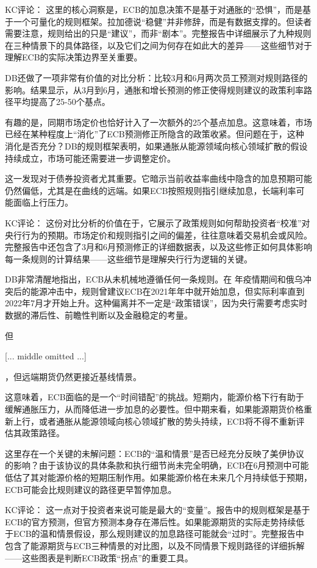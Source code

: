 \documentclass[11pt]{ctexart}
\begin{document}
KC评论： 这里的核心洞察是，ECB的加息决策不是基于对通胀的“恐惧”，而是基于一个可量化的规则框架。拉加德说“稳健”并非修辞，而是有数据支撑的。但读者需要注意，规则给出的只是“建议”，而非“剧本”。完整报告中详细展示了九种规则在三种情景下的具体路径，以及它们之间为何存在如此大的差异——这些细节对于理解ECB的实际决策边界至关重要。

DB还做了一项非常有价值的对比分析：比较3月和6月两次员工预测对规则路径的影响。结果显示，从3月到6月，通胀和增长预测的修正使得规则建议的政策利率路径平均提高了25-50个基点。

有趣的是，同期市场定价也恰好计入了一次额外的25个基点加息。这意味着，市场已经在某种程度上“消化”了ECB预测修正所隐含的政策收紧。但问题在于，这种消化是否充分？DB的规则框架表明，如果通胀从能源领域向核心领域扩散的假设持续成立，市场可能还需要进一步调整定价。

这一发现对于债券投资者尤其重要。它暗示当前收益率曲线中隐含的加息预期可能仍然偏低，尤其是在曲线的远端。如果ECB按照规则指引继续加息，长端利率可能面临上行压力。

KC评论： 这份对比分析的价值在于，它展示了政策规则如何帮助投资者“校准”对央行行为的预期。市场定价和规则指引之间的偏差，往往意味着交易机会或风险。完整报告中还包含了3月和6月预测修正的详细数据表，以及这些修正如何具体影响每一条规则的计算结果——这些细节是理解央行行为逻辑的关键。

DB非常清醒地指出，ECB从未机械地遵循任何一条规则。在 年疫情期间和俄乌冲突后的能源冲击中，规则曾建议ECB在2021年年中就开始加息，但实际利率直到2022年7月才开始上升。这种偏离并不一定是“政策错误”，因为央行需要考虑实时数据的滞后性、前瞻性判断以及金融稳定的考量。

但

[... middle omitted ...]

，但远端期货仍然更接近基线情景。

这意味着，ECB面临的是一个“时间错配”的挑战。短期内，能源价格下行有助于缓解通胀压力，从而降低进一步加息的必要性。但中期来看，如果能源期货价格重新上行，或者通胀从能源领域向核心领域扩散的势头持续，ECB将不得不重新评估其政策路径。

这里存在一个关键的未解问题：ECB的“温和情景”是否已经充分反映了美伊协议的影响？由于该协议的具体条款和执行细节尚未完全明确，ECB在6月预测中可能低估了其对能源价格的短期压制作用。如果能源价格在未来几个月持续低于预期，ECB可能会比规则建议的路径更早暂停加息。

KC评论： 这一点对于投资者来说可能是最大的“变量”。报告中的规则框架是基于ECB的官方预测，但官方预测本身存在滞后性。如果能源期货的实际走势持续低于ECB的温和情景假设，那么规则建议的加息路径可能就会“过时”。完整报告中包含了能源期货与ECB三种情景的对比图，以及不同情景下规则路径的详细拆解——这些图表是判断ECB政策“拐点”的重要工具。
\end{document}
